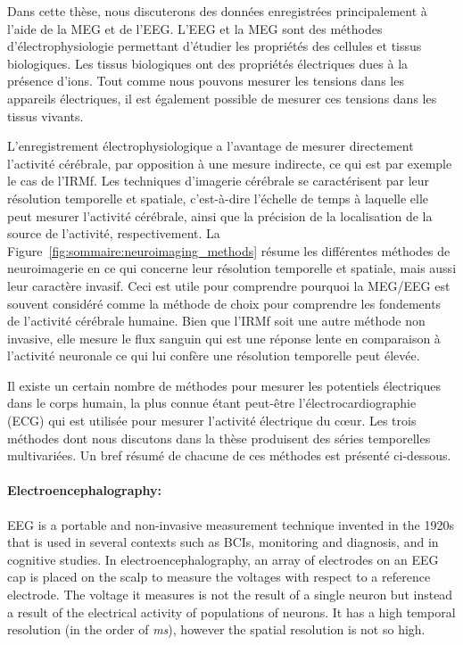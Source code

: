 Dans cette thèse, nous discuterons des données enregistrées principalement à l'aide de la MEG et de l’EEG. L'EEG et la MEG sont des méthodes d'électrophysiologie permettant d’étudier les propriétés des cellules et tissus biologiques. Les tissus biologiques ont des propriétés électriques dues à la présence d'ions. Tout comme nous pouvons mesurer les tensions dans les appareils électriques, il est également possible de mesurer ces tensions dans les tissus vivants.

L'enregistrement électrophysiologique a l'avantage de mesurer directement l'activité cérébrale, par opposition à une mesure indirecte, ce qui est par exemple le cas de l'IRMf. Les techniques d'imagerie cérébrale se caractérisent par leur résolution temporelle et spatiale, c'est-à-dire l'échelle de temps à laquelle elle peut mesurer l'activité cérébrale, ainsi que la précision de la localisation de la source de l'activité, respectivement. La Figure~\ref{fig:sommaire:neuroimaging_methods} résume les différentes méthodes de neuroimagerie en ce qui concerne leur résolution temporelle et spatiale, mais aussi leur caractère invasif. Ceci est utile pour comprendre pourquoi la MEG/EEG est souvent considéré comme la méthode de choix pour comprendre les fondements de l'activité cérébrale humaine. Bien que l'IRMf soit une autre méthode non invasive, elle mesure le flux sanguin qui est une réponse lente en comparaison à l'activité neuronale ce qui lui confère une résolution temporelle peut élevée.

Il existe un certain nombre de méthodes pour mesurer les potentiels électriques dans le corps humain, la plus connue étant peut-être l'électrocardiographie (ECG) qui est utilisée pour mesurer l'activité électrique du cœur. Les trois méthodes dont nous discutons dans la thèse produisent des séries temporelles multivariées. Un bref résumé de chacune de ces méthodes est présenté ci-dessous.

\paragraph{Electroencephalography: } \Ac{EEG} is a portable and non-invasive measurement technique invented in the 1920s that is  used in several contexts such as \acp{BCI}, monitoring and diagnosis, and in cognitive studies. 
In electroencephalography, an array of electrodes on an \ac{EEG} cap is placed on the scalp to measure the voltages with respect to a reference electrode. 
The voltage it measures is not the result of a single neuron but instead a result of the electrical activity of populations of  neurons. It has a high temporal resolution (in the order of \emph{ms}), however the spatial resolution is not so high.

